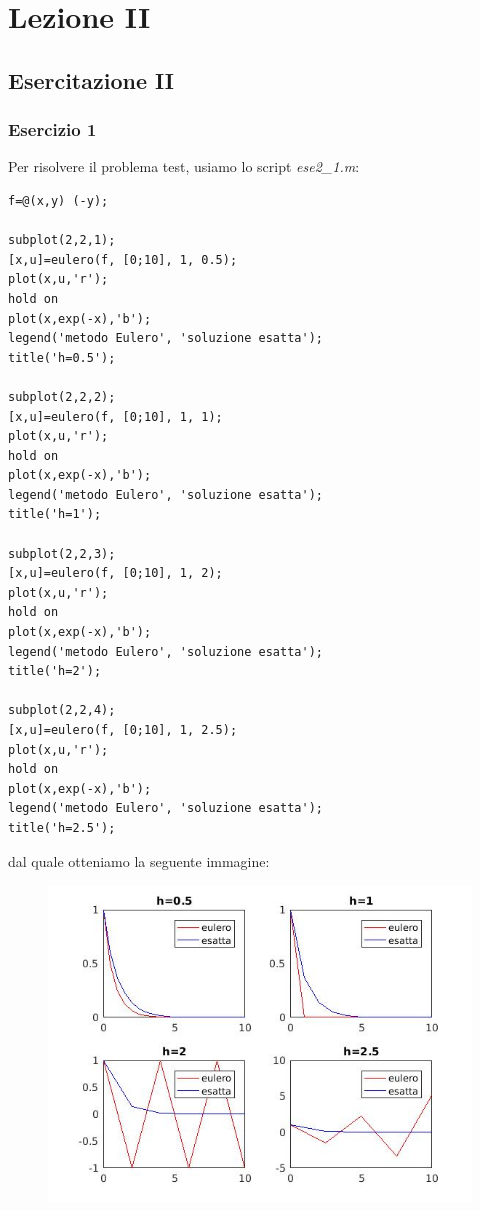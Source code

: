 \documentclass[11pt,a4paper,twoside,openright,titlepage,
headinclude,footinclude,BCOR5mm,
numbers=noenddot,cleardoublepage=empty,
tablecaptionabove]{scrbook}
\begin{document}
\chapter{Lezione II}
\section{Esercitazione II}
\subsection{Esercizio 1}
Per risolvere il problema test, usiamo lo script \emph{ese2\_1.m}:
\begin{lstlisting}[frame=trBL]
f=@(x,y) (-y);

subplot(2,2,1);
[x,u]=eulero(f, [0;10], 1, 0.5);
plot(x,u,'r');
hold on
plot(x,exp(-x),'b');
legend('metodo Eulero', 'soluzione esatta');
title('h=0.5');

subplot(2,2,2);
[x,u]=eulero(f, [0;10], 1, 1);
plot(x,u,'r');
hold on
plot(x,exp(-x),'b');
legend('metodo Eulero', 'soluzione esatta');
title('h=1');

subplot(2,2,3);
[x,u]=eulero(f, [0;10], 1, 2);
plot(x,u,'r');
hold on
plot(x,exp(-x),'b');
legend('metodo Eulero', 'soluzione esatta');
title('h=2');

subplot(2,2,4);
[x,u]=eulero(f, [0;10], 1, 2.5);
plot(x,u,'r');
hold on
plot(x,exp(-x),'b');
legend('metodo Eulero', 'soluzione esatta');
title('h=2.5');
\end{lstlisting}
dal quale otteniamo la seguente immagine:
\begin{figure}[h!]
\centering
\includegraphics[width=\textwidth]{figs/ese2_1.jpg}
\end{figure}
\newpage
\end{document}
